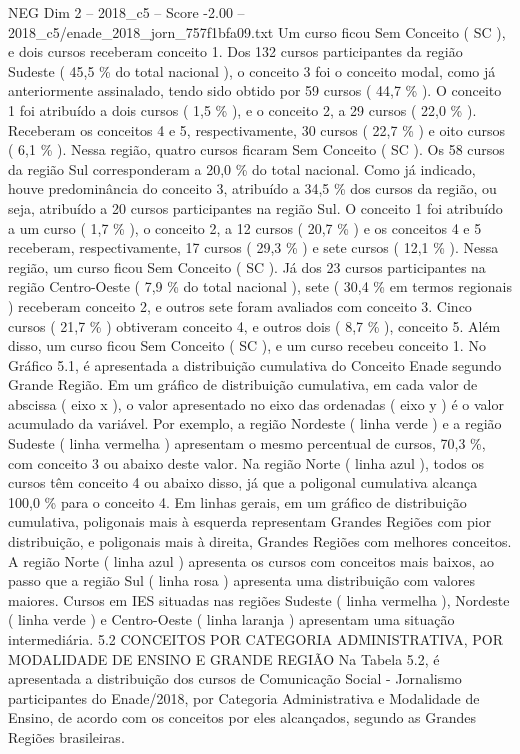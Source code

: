 \begin{textsample}{NEG Dim 2 – 2018\_c5 – Score -2.00 – 2018\_c5/enade\_2018\_jorn\_757f1bfa09.txt}
Um curso ficou Sem Conceito ( SC ), e dois cursos receberam conceito 1.
Dos 132 cursos participantes da região Sudeste ( 45,5 \% do total nacional ), o conceito 3 foi o conceito modal, como já anteriormente assinalado, tendo sido obtido por 59 cursos ( 44,7 \% ).
O conceito 1 foi atribuído a dois cursos ( 1,5 \% ), e o conceito 2, a 29 cursos ( 22,0 \% ).
Receberam os conceitos 4 e 5, respectivamente, 30 cursos ( 22,7 \% ) e oito cursos ( 6,1 \% ).
Nessa região, quatro cursos ficaram Sem Conceito ( SC ).
Os 58 cursos da região Sul corresponderam a 20,0 \% do total nacional.
Como já indicado, houve predominância do conceito 3, atribuído a 34,5 \% dos cursos da região, ou seja, atribuído a 20 cursos participantes na região Sul.
O conceito 1 foi atribuído a um curso ( 1,7 \% ), o conceito 2, a 12 cursos ( 20,7 \% ) e os conceitos 4 e 5 receberam, respectivamente, 17 cursos ( 29,3 \% ) e sete cursos ( 12,1 \% ).
Nessa região, um curso ficou Sem Conceito ( SC ).
Já dos 23 cursos participantes na região Centro-Oeste ( 7,9 \% do total nacional ), sete ( 30,4 \% em termos regionais ) receberam conceito 2, e outros sete foram avaliados com conceito 3.
Cinco cursos ( 21,7 \% ) obtiveram conceito 4, e outros dois ( 8,7 \% ), conceito 5.
Além disso, um curso ficou Sem Conceito ( SC ), e um curso recebeu conceito 1.
No Gráfico 5.1, é apresentada a distribuição cumulativa do Conceito Enade segundo Grande Região.
Em um gráfico de distribuição cumulativa, em cada valor de abscissa ( eixo x ), o valor apresentado no eixo das ordenadas ( eixo y ) é o valor acumulado da variável.
Por exemplo, a região Nordeste ( linha verde ) e a região Sudeste ( linha vermelha ) apresentam o mesmo percentual de cursos, 70,3 \%, com conceito 3 ou abaixo deste valor.
Na região Norte ( linha azul ), todos os cursos têm conceito 4 ou abaixo disso, já que a poligonal cumulativa alcança 100,0 \% para o conceito 4.
Em linhas gerais, em um gráfico de distribuição cumulativa, poligonais mais à esquerda representam Grandes Regiões com pior distribuição, e poligonais mais à direita, Grandes Regiões com melhores conceitos.
A região Norte ( linha azul ) apresenta os cursos com conceitos mais baixos, ao passo que a região Sul ( linha rosa ) apresenta uma distribuição com valores maiores.
Cursos em IES situadas nas regiões Sudeste ( linha vermelha ), Nordeste ( linha verde ) e Centro-Oeste ( linha laranja ) apresentam uma situação intermediária. 5.2 CONCEITOS POR CATEGORIA ADMINISTRATIVA, POR MODALIDADE DE ENSINO E GRANDE REGIÃO Na Tabela 5.2, é apresentada a distribuição dos cursos de Comunicação Social - Jornalismo participantes do Enade/2018, por Categoria Administrativa e Modalidade de Ensino, de acordo com os conceitos por eles alcançados, segundo as Grandes Regiões brasileiras.

\end{textsample}

